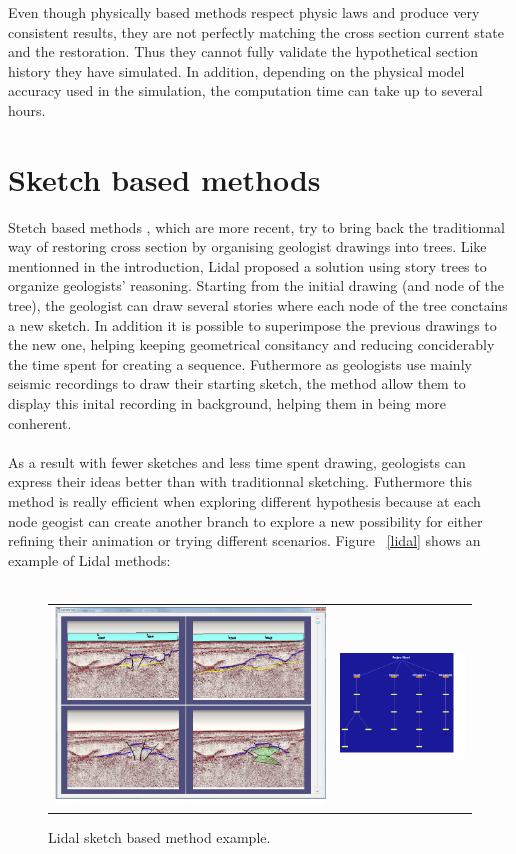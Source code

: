 \documentclass[12pt, a4paper]{report} %
\begin{document}
Even though physically based methods respect physic laws and produce very consistent results, they are not perfectly matching the cross section current state and the restoration. Thus they cannot fully validate the hypothetical section history they have simulated. In addition, depending on the physical model accuracy used in the simulation, the computation time can take up to several hours.

\section{Sketch based methods}

Stetch based methods , which are more recent, try to bring back the traditionnal way of restoring cross section by organising geologist drawings into trees.
Like mentionned in the introduction, Lidal \cite{lidal} proposed a solution using story trees to organize geologists' reasoning. Starting from the initial drawing (and node of the tree), the geologist can draw several stories where each node of the tree conctains a new sketch. In addition it is possible to superimpose the previous drawings to the new one, helping keeping geometrical consitancy and reducing conciderably the time spent for creating a sequence. Futhermore as geologists use mainly seismic recordings to draw their starting sketch, the method allow them to display this inital recording in background, helping them in being more conherent.\\\\
 As a result with fewer sketches and less time spent drawing, geologists can express their ideas better than with traditionnal sketching. Futhermore this method is really efficient when exploring different hypothesis  because at each node geogist can create another branch to explore a new possibility for either refining their animation or trying different scenarios. Figure ~\ref{lidal} shows an example of Lidal methods:\\\\
 \begin{figure}[htb]
\centering
\begin{tabular}{@{}cc@{}}
\includegraphics[width=.35\textwidth]{lidal0.png}&
\includegraphics[width=.35\textwidth]{lidal1.png}\\
\end{tabular}
\caption{Lidal sketch based method example.}
\label{lidal}
\label{unerodeeg}
\end{figure}
\end{document}
